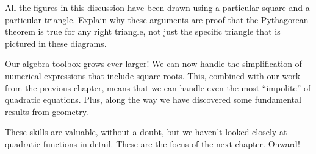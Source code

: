 All the figures in this discussion have been drawn using a particular square and a particular triangle. Explain why these arguments are proof that the Pythagorean theorem is true for any right triangle, not just the specific triangle that is pictured in these diagrams.


\chaptersummary

Our algebra toolbox grows ever larger! We can now handle the simplification of numerical expressions that include square roots. This, combined with our work from the previous chapter, means that we can handle even the most ``impolite'' of quadratic equations. Plus, along the way we have discovered some fundamental results from geometry.

These skills are valuable, without a doubt, but we haven't looked closely at quadratic functions in detail. These are the focus of the next chapter. Onward!
